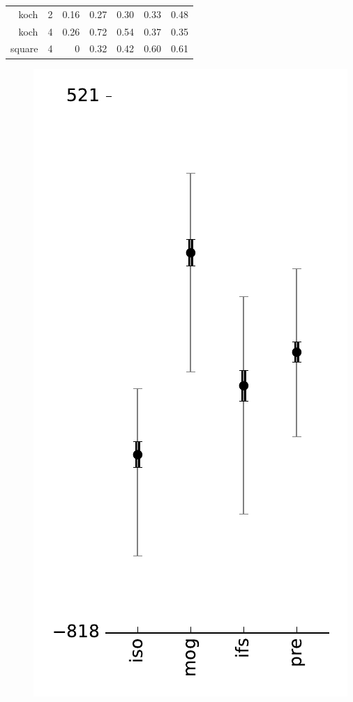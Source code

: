 \documentclass[reprint,amsmath,amssymb,aps,prl]{revtex4-1}
\begin{document}
\begin{figure}[tbh]
\begin{subfigure}{0.49\linewidth}
\begin{subfigure}{\linewidth}
\begin{tabular}{ r r r r r r r}
			koch  & 2 & 0.16 & 0.27 & 0.30 & 0.33 & 0.48 \\
			koch  & 4 & 0.26 & 0.72 & 0.54 & 0.37 & 0.35 \\
			square & 4 & 0 & 0.32 & 0.42 & 0.60 & 0.61 \\
			\hline
		\end{tabular}
		\caption{}
		\label{figure:convergence}
	\end{subfigure}
	\begin{subfigure}{\linewidth}
		\begin{subfigure}{0.31\linewidth}  
			\includegraphics[width=\linewidth]{../img/currency/likelihoods.pdf}\\

\end{subfigure}
\end{subfigure}
\end{subfigure}
\end{figure}
\end{document}
